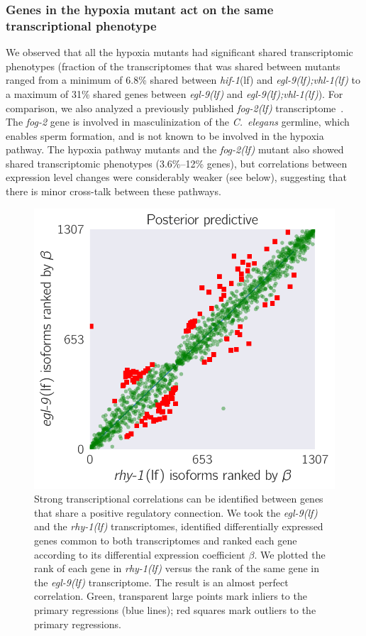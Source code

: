 \documentclass[10pt, onecolumn]{article}
\newcommand{\cel}{\emph{C.~elegans}}
\newcommand{\gene}[1]{\emph{#1}}
\newcommand{\fog}{\emph{\mbox{fog-2(lf)}}}
\newcommand{\egl}{\emph{\mbox{egl-9}(lf)}}
\newcommand{\rhy}{\emph{\mbox{rhy-1}(lf)}}
\newcommand{\eglvhl}{\emph{\mbox{egl-9(lf);vhl-1(lf)}}}
\newcommand{\hif}{\emph{\mbox{hif-1}}(lf)}
\begin{document}
\subsubsection*{Genes in the hypoxia mutant act on the same transcriptional phenotype}
\label{sec:phenotypes}
We observed that all the hypoxia mutants had significant shared transcriptomic
phenotypes (fraction of the transcriptomes that was shared between mutants
ranged from a minimum of 6.8\% shared between \hif{} and \eglvhl{} to a maximum
of 31\% shared genes between \egl{} and \eglvhl{}). For comparison, we also
analyzed a previously published \fog{} transcriptome~\cite{Angeles-Albores2016a}.
The \gene{fog-2} gene is involved in masculinization of the \cel{} germline,
which enables sperm formation, and is not known to be involved in the hypoxia
pathway. The hypoxia pathway mutants and the \fog{} mutant also showed shared
transcriptomic phenotypes (3.6\%--12\% genes), but correlations between
expression level changes were considerably weaker (see below), suggesting that
there is minor cross-talk between these pathways.


\begin{figure}[tbhp]
\centering
\includegraphics[width=.4\linewidth]{../figs/multiplemodes-eb.pdf}
\caption{
Strong transcriptional correlations can be identified between genes
that share a positive regulatory connection. We took the \egl{} and the \rhy{}
transcriptomes, identified differentially expressed genes common to both
transcriptomes and ranked each gene according to its differential expression
coefficient $\beta$. We plotted the rank of each gene in \rhy{} versus the
rank of the same gene in the \egl{} transcriptome. The result is an almost
perfect correlation. Green, transparent large points mark inliers to the primary
regressions (blue lines); red squares mark outliers to the primary regressions.
}
\label{fig:genetic_interactions}
\end{figure}
\end{document}
